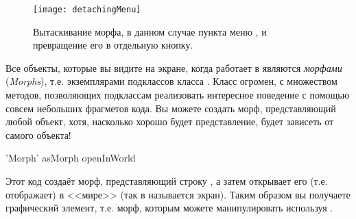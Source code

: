 \documentclass[a4paper,10pt,twoside]{book}
\begin{document}
\begin{figure}[ht]
	\centerline{\texttt{[image: detachingMenu]}}
	\caption{Вытаскивание морфа, в данном случае пункта меню , и превращение его в отдельную кнопку.
		}
\end{figure}

Все объекты, которые вы видите на экране, когда работает в \pharo являются \emph{морфами} (\emph{Morphs}), т.е. экземплярами подклассов класса .
Класс \mbox{} огромен, с множеством методов, позволяющих подклассам реализовать интересное поведение с помощью совсем небольших фрагметов кода.
Вы можете создать морф, представляющий любой объект, хотя, насколько хорошо будет представление, будет зависеть от самого объекта!

\begin{code}{}
'Morph' asMorph openInWorld 
\end{code}


Этот код создаёт морф, представляющий строку , а затем открывает его (т.е. отображает) в <<мире>> (так в \pharo называется экран).
Таким образом вы получаете графический элемент, т.е. морф, которым можете манипулировать используя \metaclick.
\end{document}
